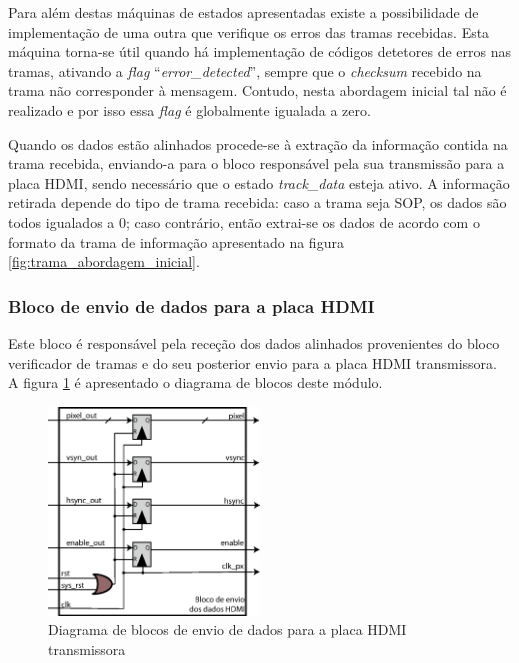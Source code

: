 \documentclass[11pt,a4paper]{article}
\begin{document}
	Para além destas máquinas de estados apresentadas existe a possibilidade de implementação de uma outra que verifique os erros das tramas recebidas. Esta máquina torna-se útil quando há implementação de códigos detetores de erros nas tramas, ativando a \textit{flag} ``\textit{error\_detected}'', sempre que o \textit{checksum} recebido na trama não corresponder à mensagem. Contudo, nesta abordagem inicial tal não é realizado e por isso essa \textit{flag} é globalmente igualada a zero.
	
	Quando os dados estão alinhados procede-se à extração da informação contida na trama recebida, enviando-a para o bloco responsável pela sua transmissão para a placa HDMI, sendo necessário que o estado  \textit{track\_data} esteja ativo. A informação retirada depende do tipo de trama recebida: caso a trama seja SOP, os dados são todos igualados a 0; caso contrário, então extrai-se os dados de acordo com o formato da trama de informação apresentado na figura \ref{fig:trama_abordagem_inicial}.
	
	
	
	\subsubsection*{Bloco de envio de dados para a placa HDMI} \label{subsub:serial_send signals to HDMI}
	
	Este bloco é responsável pela receção dos dados alinhados provenientes do bloco verificador de tramas e do seu posterior envio para a placa HDMI transmissora. A figura \ref{fig:sync_block_to_HDMI} é apresentado o diagrama de blocos deste módulo.
	
	\begin{figure}[h!]
		\begin{center}
			\leavevmode
			\includegraphics[width=0.5\textwidth]{sync_block_to_HDMI}
			\caption[Diagrama de blocos de envio de dados para a placa HDMI transmissora]{Diagrama de blocos de envio de dados para a placa HDMI transmissora}
			\label{fig:sync_block_to_HDMI}
		\end{center}
	\end{figure}
	
\end{document}
